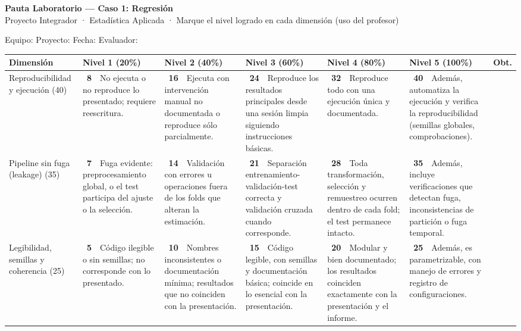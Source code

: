 \documentclass[11pt,letterpaper]{article}
\newcommand{\chk}{\framebox[0.42cm]{\rule{0pt}{0.30cm}}}
\begin{document}
\clearpage
\begin{center}
{\large \textbf{Pauta Laboratorio --- Caso 1: Regresión}}\\[0.1cm]
{\footnotesize Proyecto Integrador · Estadística Aplicada · Marque el nivel logrado en cada dimensión (uso del profesor)}
\end{center}
\vspace{0.05cm}
{\small Equipo: \underline{\hspace{5cm}}\quad Proyecto: \underline{\hspace{5.5cm}}\quad Fecha: \underline{\hspace{2.6cm}}\quad Evaluador: \underline{\hspace{3.5cm}}}
\vspace{0.15cm}

\footnotesize\renewcommand{\arraystretch}{1.15}
\begin{tabular}{p{2.4cm} p{3.15cm} p{3.15cm} p{3.15cm} p{3.15cm} p{3.15cm} p{1.2cm}}
\toprule
Dimensión & Nivel 1 (20\%) & Nivel 2 (40\%) & Nivel 3 (60\%) & Nivel 4 (80\%) & Nivel 5 (100\%) & Obt. \\
\midrule
Reproducibilidad y ejecución (40) & \chk\ \textbf{8}~~No ejecuta o no reproduce lo presentado; requiere reescritura. & \chk\ \textbf{16}~~Ejecuta con intervención manual no documentada o reproduce sólo parcialmente. & \chk\ \textbf{24}~~Reproduce los resultados principales desde una sesión limpia siguiendo instrucciones básicas. & \chk\ \textbf{32}~~Reproduce todo con una ejecución única y documentada. & \chk\ \textbf{40}~~Además, automatiza la ejecución y verifica la reproducibilidad (semillas globales, comprobaciones). & \rule{0pt}{0.7cm} \\
Pipeline sin fuga (leakage) (35) & \chk\ \textbf{7}~~Fuga evidente: preprocesamiento global, o el test participa del ajuste o la selección. & \chk\ \textbf{14}~~Validación con errores u operaciones fuera de los folds que alteran la estimación. & \chk\ \textbf{21}~~Separación entrenamiento-validación-test correcta y validación cruzada cuando corresponde. & \chk\ \textbf{28}~~Toda transformación, selección y remuestreo ocurren dentro de cada fold; el test permanece intacto. & \chk\ \textbf{35}~~Además, incluye verificaciones que detectan fuga, inconsistencias de partición o fuga temporal. & \rule{0pt}{0.7cm} \\
Legibilidad, semillas y coherencia (25) & \chk\ \textbf{5}~~Código ilegible o sin semillas; no corresponde con lo presentado. & \chk\ \textbf{10}~~Nombres inconsistentes o documentación mínima; resultados que no coinciden con la presentación. & \chk\ \textbf{15}~~Código legible, con semillas y documentación básica; coincide en lo esencial con la presentación. & \chk\ \textbf{20}~~Modular y bien documentado; los resultados coinciden exactamente con la presentación y el informe. & \chk\ \textbf{25}~~Además, es parametrizable, con manejo de errores y registro de configuraciones. & \rule{0pt}{0.7cm} \\
\bottomrule
\end{tabular}
\end{document}
